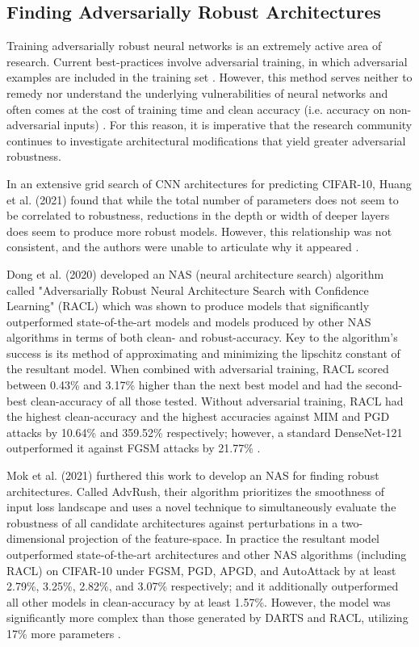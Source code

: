 \documentclass[10pt,twocolumn,letterpaper]{article}
\begin{document}
  \subsection{Finding Adversarially Robust Architectures}
    Training adversarially robust neural networks is an extremely active area of research. Current best-practices involve adversarial training, in which adversarial examples are included in the training set \cite{Madry}. However, this method serves neither to remedy nor understand the underlying vulnerabilities of neural networks and often comes at the cost of training time and clean accuracy (i.e. accuracy on non-adversarial inputs) \cite{RobustVsAccuracy}. For this reason, it is imperative that the research community continues to investigate architectural modifications that yield greater adversarial robustness.

    In an extensive grid search of CNN architectures for predicting CIFAR-10, Huang et al. (2021) found that while the total number of parameters does not seem to be correlated to robustness, reductions in the depth or width of deeper layers does seem to produce more robust models. However, this relationship was not consistent, and the authors were unable to articulate why it appeared \cite{Huang}.

    Dong et al. (2020) developed an NAS (neural architecture search) algorithm called "Adversarially Robust Neural Architecture Search with Confidence Learning" (RACL) which was shown to produce models that significantly outperformed state-of-the-art models and models produced by other NAS algorithms in terms of both clean- and robust-accuracy. Key to the algorithm's success is its method of approximating and minimizing the lipschitz constant of the resultant model. When combined with adversarial training, RACL scored between 0.43\% and 3.17\% higher than the next best model and had the second-best clean-accuracy of all those tested. Without adversarial training, RACL had the highest clean-accuracy and the highest accuracies against MIM and PGD attacks by 10.64\% and 359.52\% respectively; however, a standard DenseNet-121 outperformed it against FGSM attacks by 21.77\% \cite{RACL}.

    Mok et al. (2021) furthered this work to develop an NAS for finding robust architectures. Called AdvRush, their algorithm prioritizes the smoothness of input loss landscape and uses a novel technique to simultaneously evaluate the robustness of all candidate architectures against perturbations in a two-dimensional projection of the feature-space. In practice the resultant model outperformed state-of-the-art architectures and other NAS algorithms (including RACL) on CIFAR-10 under FGSM, PGD, APGD, and AutoAttack by at least 2.79\%, 3.25\%, 2.82\%, and 3.07\% respectively; and it additionally outperformed all other models in clean-accuracy by at least 1.57\%. However, the model was significantly more complex than those generated by DARTS and RACL, utilizing 17\% more parameters \cite{AdvRush}.
\end{document}
